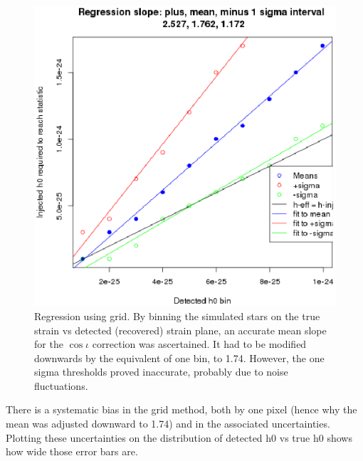 \begin{figure}
\begin{center}
\includegraphics[width=0.3\paperwidth,height=0.2\paperheight]{PlotHeffVsH0TrueRegressions.eps}
\caption{Regression using grid. By binning the simulated stars on the true strain vs detected (recovered) strain plane, an accurate mean slope for the $\cos \iota$ correction was ascertained. It had to be modified downwards by the equivalent of one bin, to 1.74. However, the one sigma thresholds proved inaccurate, probably due to noise fluctuations.
}
\end{center}
\end{figure}


There is a systematic bias in the grid method, both by one pixel (hence why the mean was adjusted downward to 1.74) and in the associated uncertainties. Plotting these uncertainties on the distribution of {detected h0} vs {true h0} shows how wide those error bars are.

